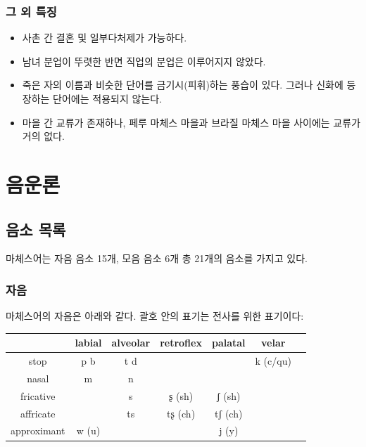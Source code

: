 \subsubsection{그 외 특징}
\begin{itemize}
\item 사촌 간 결혼 및 일부다처제가 가능하다. 
\item 남녀 분업이 뚜렷한 반면 직업의 분업은 이루어지지 않았다. 
\item 죽은 자의 이름과 비슷한 단어를 금기시(피휘)하는 풍습이 있다. 그러나 신화에 등장하는 단어에는 적용되지 않는다. 
\item 마을 간 교류가 존재하나, 페루 마체스 마을과 브라질 마체스 마을 사이에는 교류가 거의 없다. 
\end{itemize}

\section{음운론}
\subsection{음소 목록}
마체스어는 자음 음소 15개, 모음 음소 6개 총 21개의 음소를 가지고 있다. 
\subsubsection{자음}
마체스어의 자음은 아래와 같다. 괄호 안의 표기는 전사를 위한 표기이다:  

\begin{center}
\begin{tabular}{|c|c|c|c|c|c|c|}
\hline
			& labial	& alveolar	& retroflex	& palatal	& velar	\\ \hline
stop			& p b	& t d 		& 			&		& k (c/qu)	\\ \hline
nasal		& m		& n			&			&		& 		\\ \hline
fricative		& 		& s			& ʂ (sh)		& ʃ (sh)	&		\\ \hline
affricate		& 		& ts			& tʂ (ch)		& tʃ (ch)	&		\\ \hline
approximant	& w (u)	&			&			& j (y)	&	 	\\
\hline
\end{tabular}
\end{center}

